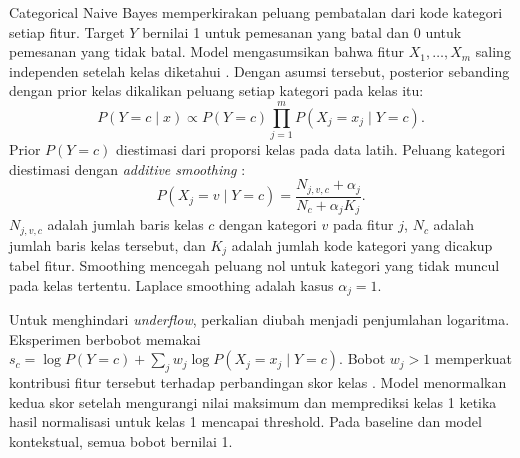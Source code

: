 Categorical Naive Bayes memperkirakan peluang pembatalan dari kode kategori setiap fitur. Target \(Y\) bernilai 1 untuk pemesanan yang batal dan 0 untuk pemesanan yang tidak batal. Model mengasumsikan bahwa fitur \(X_1,\ldots,X_m\) saling independen setelah kelas diketahui \cite{ref:bayesnet}. Dengan asumsi tersebut, posterior sebanding dengan prior kelas dikalikan peluang setiap kategori pada kelas itu:
\begin{equation}
  P(Y=c\mid x) \propto P(Y=c)\prod_{j=1}^{m} P(X_j=x_j\mid Y=c).
\end{equation}
Prior \(P(Y=c)\) diestimasi dari proporsi kelas pada data latih. Peluang kategori diestimasi dengan \emph{additive smoothing} \cite{ref:categoricalnb}:
\begin{equation}
  P(X_j=v\mid Y=c)=\frac{N_{j,v,c}+\alpha_j}{N_c+\alpha_j K_j}.
\end{equation}
\(N_{j,v,c}\) adalah jumlah baris kelas \(c\) dengan kategori \(v\) pada fitur \(j\), \(N_c\) adalah jumlah baris kelas tersebut, dan \(K_j\) adalah jumlah kode kategori yang dicakup tabel fitur. Smoothing mencegah peluang nol untuk kategori yang tidak muncul pada kelas tertentu. Laplace smoothing adalah kasus \(\alpha_j=1\).

Untuk menghindari \emph{underflow}, perkalian diubah menjadi penjumlahan logaritma. Eksperimen berbobot memakai \(s_c=\log P(Y=c)+\sum_j w_j\log P(X_j=x_j\mid Y=c)\). Bobot \(w_j>1\) memperkuat kontribusi fitur tersebut terhadap perbandingan skor kelas \cite{ref:zaidi_nb}. Model menormalkan kedua skor setelah mengurangi nilai maksimum dan memprediksi kelas 1 ketika hasil normalisasi untuk kelas 1 mencapai threshold. Pada baseline dan model kontekstual, semua bobot bernilai 1.
